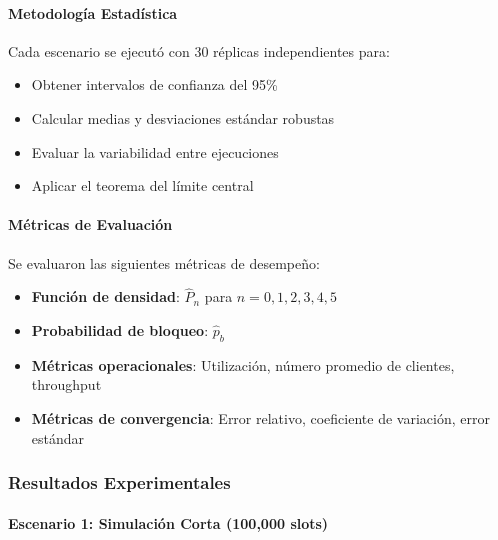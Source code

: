 \documentclass{article}
\begin{document}
\paragraph{Metodología Estadística}
Cada escenario se ejecutó con 30 réplicas independientes para:
\begin{itemize}
    \item Obtener intervalos de confianza del 95\%
    \item Calcular medias y desviaciones estándar robustas
    \item Evaluar la variabilidad entre ejecuciones
    \item Aplicar el teorema del límite central
\end{itemize}

\paragraph{Métricas de Evaluación}
Se evaluaron las siguientes métricas de desempeño:
\begin{itemize}
    \item \textbf{Función de densidad}: $\hat{P}_n$ para $n = 0, 1, 2, 3, 4, 5$
    \item \textbf{Probabilidad de bloqueo}: $\hat{p}_b$
    \item \textbf{Métricas operacionales}: Utilización, número promedio de clientes, throughput
    \item \textbf{Métricas de convergencia}: Error relativo, coeficiente de variación, error estándar
\end{itemize}

\subsubsection{Resultados Experimentales}

\paragraph{Escenario 1: Simulación Corta (100,000 slots)}
\end{document}
